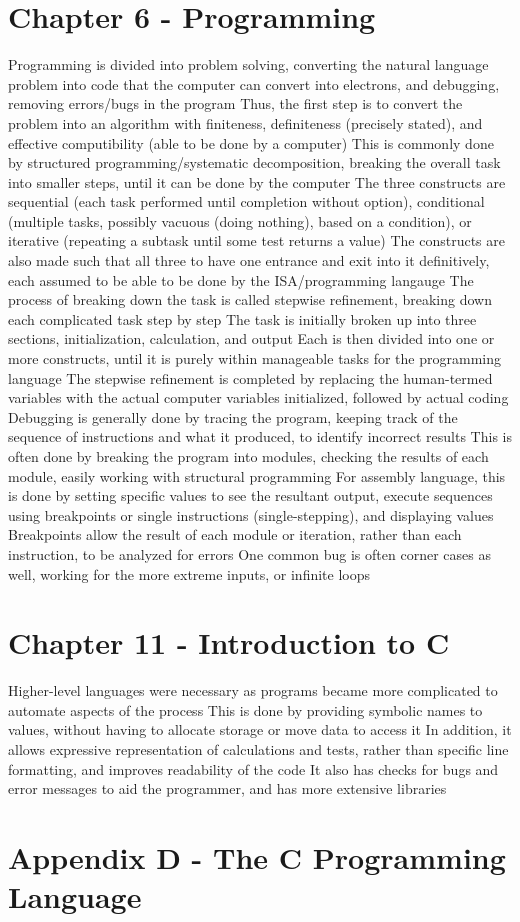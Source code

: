 \documentclass[11 pt, twoside]{article}
\newenvironment{outline*}
{
	\begin{outline}[enumerate]
	}
	{\end{outline}
}
\begin{document}
\section{Chapter 6 - Programming}
\begin{outline*}
\1 Programming is divided into problem solving, converting the natural language problem into code that the computer can convert into electrons, and debugging, removing errors/bugs in the program
\2 Thus, the first step is to convert the problem into an algorithm with finiteness, definiteness (precisely stated), and effective computibility (able to be done by a computer)
\1 This is commonly done by structured programming/systematic decomposition, breaking the overall task into smaller steps, until it can be done by the computer
\2 The three constructs are sequential (each task performed until completion without option), conditional (multiple tasks, possibly vacuous (doing nothing), based on a condition), or iterative (repeating a subtask until some test returns a value)
\2 The constructs are also made such that all three to have one entrance and exit into it definitively, each assumed to be able to be done by the ISA/programming langauge
\2 The process of breaking down the task is called stepwise refinement, breaking down each complicated task step by step
\3 The task is initially broken up into three sections, initialization, calculation, and output
\3 Each is then divided into one or more constructs, until it is purely within manageable tasks for the programming language
\2 The stepwise refinement is completed by replacing the human-termed variables with the actual computer variables initialized, followed by actual coding
\1 Debugging is generally done by tracing the program, keeping track of the sequence of instructions and what it produced, to identify incorrect results
\2 This is often done by breaking the program into modules, checking the results of each module, easily working with structural programming
\2 For assembly language, this is done by setting specific values to see the resultant output, execute sequences using breakpoints or single instructions (single-stepping), and displaying values
\3 Breakpoints allow the result of each module or iteration, rather than each instruction, to be analyzed for errors
\2 One common bug is often corner cases as well, working for the more extreme inputs, or infinite loops
\end{outline*}
\section{Chapter 11 - Introduction to C}
\begin{outline*}
\1 Higher-level languages were necessary as programs became more complicated to automate aspects of the process
\2 This is done by providing symbolic names to values, without having to allocate storage or move data to access it
\2 In addition, it allows expressive representation of calculations and tests, rather than specific line formatting, and improves readability of the code
\2 It also has checks for bugs and error messages to aid the programmer, and has more extensive libraries
\end{outline*}
\section{Appendix D - The C Programming Language}
\begin{outline*}

\end{outline*}
\end{document}
